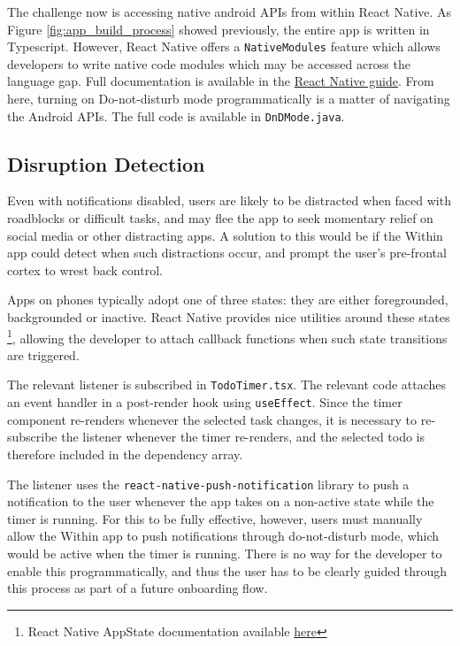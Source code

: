 The challenge now is accessing native android APIs from within React Native. As Figure \ref{fig:app_build_process} showed previously, the entire app is written in Typescript. However, React Native offers a \texttt{NativeModules} feature which allows developers to write native code modules which may be accessed across the language gap. Full documentation is available in the \href{https://reactnative.dev/docs/native-modules-intro}{React Native guide}. From here, turning on Do-not-disturb mode programmatically is a matter of navigating the Android APIs. The full code is available in \texttt{DnDMode.java}.


\subsection{Disruption Detection}
Even with notifications disabled, users are likely to be distracted when faced with roadblocks or difficult tasks, and may flee the app to seek momentary relief on social media or other distracting apps. A solution to this would be if the Within app could detect when such distractions occur, and prompt the user's pre-frontal cortex to wrest back control.

Apps on phones typically adopt one of three states: they are either foregrounded, backgrounded or inactive. React Native provides nice utilities around these states \footnote{React Native AppState documentation available \href{https://reactnative.dev/docs/next/appstate}{here}}, allowing the developer to attach callback functions when such state transitions are triggered.

The relevant listener is subscribed in \texttt{TodoTimer.tsx}. The relevant code attaches an event handler in a post-render hook using \texttt{useEffect}. Since the timer component re-renders whenever the selected task changes, it is necessary to re-subscribe the listener whenever the timer re-renders, and the selected todo is therefore included in the dependency array.

The listener uses the \texttt{react-native-push-notification} library to push a notification to the user whenever the app takes on a non-active state while the timer is running. For this to be fully effective, however, users must manually allow the Within app to push notifications through do-not-disturb mode, which would be active when the timer is running. There is no way for the developer to enable this programmatically, and thus the user has to be clearly guided through this process as part of a future onboarding flow.

